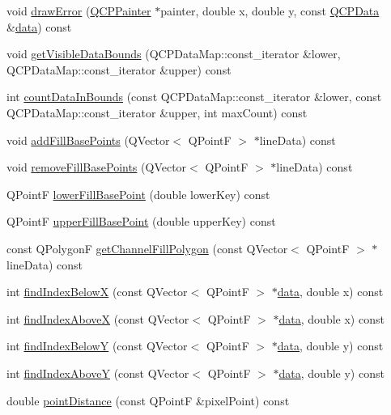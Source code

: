 \begin{DoxyCompactItemize}
\item 
void \hyperlink{class_q_c_p_graph_a4df6807066ce877705e999773e7ffbc4}{draw\+Error} (\hyperlink{class_q_c_p_painter}{Q\+C\+P\+Painter} $\ast$painter, double x, double y, const \hyperlink{class_q_c_p_data}{Q\+C\+P\+Data} \&\hyperlink{class_q_c_p_graph_a2f58436df4f86a2792b776a21642b3d9}{data}) const 
\item 
void \hyperlink{class_q_c_p_graph_a6a317cb14a83dae0841c7041a63d6d9d}{get\+Visible\+Data\+Bounds} (Q\+C\+P\+Data\+Map\+::const\+\_\+iterator \&lower, Q\+C\+P\+Data\+Map\+::const\+\_\+iterator \&upper) const 
\item 
int \hyperlink{class_q_c_p_graph_a13f6a3aa60227e03ab1f7aa8eec6589f}{count\+Data\+In\+Bounds} (const Q\+C\+P\+Data\+Map\+::const\+\_\+iterator \&lower, const Q\+C\+P\+Data\+Map\+::const\+\_\+iterator \&upper, int max\+Count) const 
\item 
void \hyperlink{class_q_c_p_graph_a5fa7884620d7c54b81dfbd255d97b636}{add\+Fill\+Base\+Points} (Q\+Vector$<$ Q\+Point\+F $>$ $\ast$line\+Data) const 
\item 
void \hyperlink{class_q_c_p_graph_ad31b49a90e91e538fd9caf011c913a68}{remove\+Fill\+Base\+Points} (Q\+Vector$<$ Q\+Point\+F $>$ $\ast$line\+Data) const 
\item 
Q\+Point\+F \hyperlink{class_q_c_p_graph_a41f982e8ceaefe6a53eb7432f26d64b6}{lower\+Fill\+Base\+Point} (double lower\+Key) const 
\item 
Q\+Point\+F \hyperlink{class_q_c_p_graph_a363d066c179e0f46cc93c12bafb0bfba}{upper\+Fill\+Base\+Point} (double upper\+Key) const 
\item 
const Q\+Polygon\+F \hyperlink{class_q_c_p_graph_a0374b7268e35cab9802a6be2b5d726d7}{get\+Channel\+Fill\+Polygon} (const Q\+Vector$<$ Q\+Point\+F $>$ $\ast$line\+Data) const 
\item 
int \hyperlink{class_q_c_p_graph_a6f4e9461d5925be9228fc4760249a04f}{find\+Index\+Below\+X} (const Q\+Vector$<$ Q\+Point\+F $>$ $\ast$\hyperlink{class_q_c_p_graph_a2f58436df4f86a2792b776a21642b3d9}{data}, double x) const 
\item 
int \hyperlink{class_q_c_p_graph_abab2a75b5e63630432bdd1f3b57f07fa}{find\+Index\+Above\+X} (const Q\+Vector$<$ Q\+Point\+F $>$ $\ast$\hyperlink{class_q_c_p_graph_a2f58436df4f86a2792b776a21642b3d9}{data}, double x) const 
\item 
int \hyperlink{class_q_c_p_graph_a6c4d556de3d1e02f548401001f72c6ff}{find\+Index\+Below\+Y} (const Q\+Vector$<$ Q\+Point\+F $>$ $\ast$\hyperlink{class_q_c_p_graph_a2f58436df4f86a2792b776a21642b3d9}{data}, double y) const 
\item 
int \hyperlink{class_q_c_p_graph_adf50243f1df203883a2187089734bfcb}{find\+Index\+Above\+Y} (const Q\+Vector$<$ Q\+Point\+F $>$ $\ast$\hyperlink{class_q_c_p_graph_a2f58436df4f86a2792b776a21642b3d9}{data}, double y) const 
\item 
double \hyperlink{class_q_c_p_graph_af93762a12a481a7edb4b3dd9e330dff1}{point\+Distance} (const Q\+Point\+F \&pixel\+Point) const 
\end{DoxyCompactItemize}

